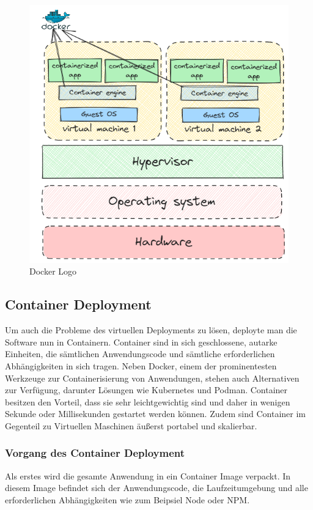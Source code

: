 \begin{figure}[h!]
    \centering
    \includegraphics[width=0.7\linewidth]{pics/virtual-deployment.png}
    \caption{Docker Logo}
    \label{fig:enter-label}
\end{figure}

\cite{Virtuelles_Deployment}

\subsection{Container Deployment}
Um auch die Probleme des virtuellen Deployments zu lösen, deployte man die Software nun in Containern.
Container sind in sich geschlossene, autarke Einheiten, die sämtlichen Anwendungscode und sämtliche erforderlichen Abhängigkeiten in sich tragen. Neben Docker, einem der prominentesten Werkzeuge zur Containerisierung von Anwendungen, stehen auch Alternativen zur Verfügung, darunter Lösungen wie Kubernetes und Podman. Container besitzen den Vorteil, dass sie sehr leichtgewichtig sind und daher in wenigen Sekunde oder Millisekunden gestartet werden können. Zudem sind Container im Gegenteil zu Virtuellen Maschinen äußerst portabel und skalierbar.



\subsubsection{Vorgang des Container Deployment}

Als erstes wird die gesamte Anwendung in ein Container Image verpackt. In diesem Image befindet sich der Anwendungscode, die Laufzeitumgebung und alle erforderlichen Abhängigkeiten wie zum Beipsiel Node oder NPM.

